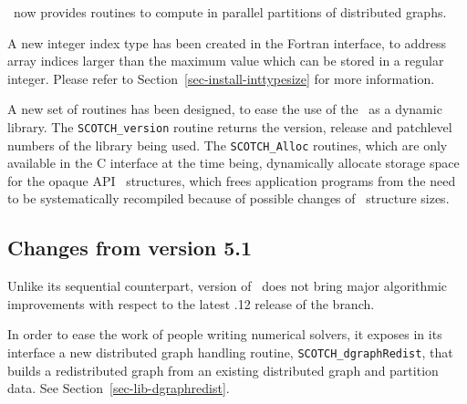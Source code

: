 \ptscotch\ now provides routines to compute in
parallel partitions of distributed graphs.

A new integer index type has been created in the Fortran interface, to
address array indices larger than the maximum value which can be
stored in a regular integer. Please refer to
Section~\ref{sec-install-inttypesize} for more information.

A new set of routines has been designed, to ease the use of the
\libscotch\ as a dynamic library. The {\tt SCOTCH\_\lbt version}
routine returns the version, release and patchlevel numbers of the
library being used. The {\tt SCOTCH\_\lbt *Alloc} routines,
which are only available in the C interface at the time being,
dynamically allocate storage space for the opaque API
\scotch\ structures, which frees application programs from the need
to be systematically recompiled because of possible changes of
\scotch\ structure sizes.

\subsection{Changes from version 5.1}

Unlike its sequential counterpart, version {} of
\ptscotch\ does not bring major algorithmic improvements with respect
to the latest {.12} release of the {} branch.

In order to ease the work of people writing numerical solvers, it
exposes in its interface a new distributed graph handling routine,
{\tt SCOTCH\_\lbt dgraph\lbt Redist}, that builds a redistributed
graph from an existing distributed graph and partition data. See
Section~\ref{sec-lib-dgraphredist}.
